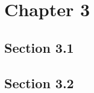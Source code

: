 \chapter{Chapter 3}
\label{cha:chap3}


\section{Section 3.1}
\label{sec:chap3sec1}


\section{Section 3.2}
\label{sec:chap3sec2}

